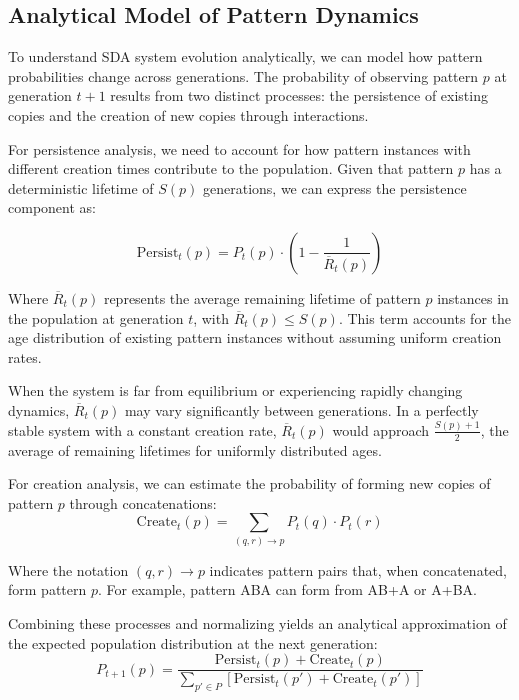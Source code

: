 \documentclass[preprint,12pt]{elsarticle}
\begin{document}
\subsection{Analytical Model of Pattern Dynamics}

To understand SDA system evolution analytically, we can model how pattern probabilities change across generations. The probability of observing pattern \(p\) at generation \(t+1\) results from two distinct processes: the persistence of existing copies and the creation of new copies through interactions.

For persistence analysis, we need to account for how pattern instances with different creation times contribute to the population. Given that pattern \(p\) has a deterministic lifetime of \(S(p)\) generations, we can express the persistence component as:

\begin{equation}
\label{eq:persist-term}
\mathrm{Persist}_t(p) = P_t(p) \cdot \left(1 - \frac{1}{\overline{R}_t(p)}\right)
\end{equation}

Where \(\overline{R}_t(p)\) represents the average remaining lifetime of pattern \(p\) instances in the population at generation \(t\), with \(\overline{R}_t(p) \leq S(p)\). This term accounts for the age distribution of existing pattern instances without assuming uniform creation rates.

When the system is far from equilibrium or experiencing rapidly changing dynamics, \(\overline{R}_t(p)\) may vary significantly between generations. In a perfectly stable system with a constant creation rate, \(\overline{R}_t(p)\) would approach \(\frac{S(p)+1}{2}\), the average of remaining lifetimes for uniformly distributed ages.

For creation analysis, we can estimate the probability of forming new copies of pattern \(p\) through concatenations:
\begin{equation}
\label{eq:create-term}
\mathrm{Create}_t(p) = \sum_{(q,r) \to p} P_t(q) \cdot P_t(r)
\end{equation}

Where the notation \((q,r) \to p\) indicates pattern pairs that, when concatenated, form pattern \(p\). For example, pattern ABA can form from AB+A or A+BA.

Combining these processes and normalizing yields an analytical approximation of the expected population distribution at the next generation:
\begin{equation}
\label{eq:full-ba-update}
P_{t+1}(p) = \frac{
  \mathrm{Persist}_t(p) + \mathrm{Create}_t(p)
}{
  \sum_{p' \in P} 
  \left[
    \mathrm{Persist}_t(p') + \mathrm{Create}_t(p')
  \right]
}
\end{equation}
\end{document}
